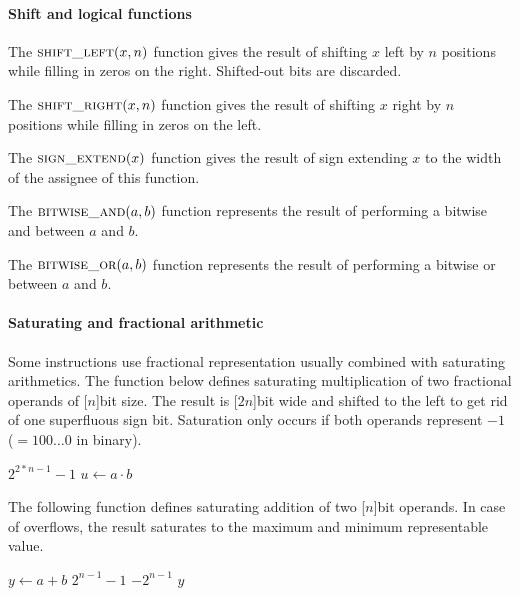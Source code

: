 \paragraph{Shift and logical functions}
The $\text{\sc{shift\_left}}(x,n)$ function gives the result of shifting $x$ left by $n$ positions while filling in zeros on the right.
Shifted-out bits are discarded.

The $\text{\sc{shift\_right}}(x,n)$ function gives the result of shifting $x$ right by $n$ positions while filling in zeros on the left.

The $\text{\sc{sign\_extend}}(x)$ function gives the result of sign extending $x$ to the width of the assignee of this function.

The $\text{\sc{bitwise\_and}}(a, b)$ function represents the result of performing a bitwise and between $a$ and $b$.

The $\text{\sc{bitwise\_or}}(a, b)$ function represents the result of performing a bitwise or between $a$ and $b$.

\paragraph{Saturating and fractional arithmetic}
Some instructions use fractional representation usually combined with saturating arithmetics.
The function below defines saturating multiplication of two fractional operands of \unit[$n$]{bit} size.
The result is \unit[$2n$]{bit} wide and shifted to the left to get rid of one superfluous sign bit.
Saturation only occurs if both operands represent $-1$ ($= 100\ldots 0$ in binary).
{\footnotesize
\begin{algorithmic}[1]
            \State \Return $2^{2*n-1} - 1$
        \Else
            \State $u \gets a \cdot b$
            \State \Return {}
        \EndIf
    \EndFunction
\end{algorithmic} }

The following function defines saturating addition of two \unit[$n$]{bit} operands.
In case of overflows, the result saturates to the maximum and minimum representable value.
{\footnotesize
\begin{algorithmic}[1]
        \State $y \gets a + b$
            \State \Return $2^{n-1} - 1$
            \State \Return $-2^{n-1}$
        \Else
            \State \Return $y$
        \EndIf
    \EndFunction
\end{algorithmic} }


